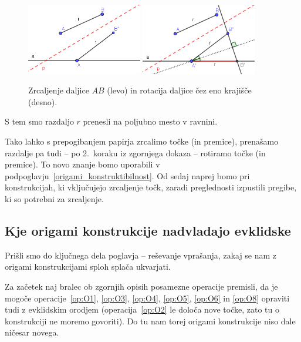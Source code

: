 \begin{dokaz}
    \begin{figure}[h]
        \centering
        \includegraphics[width=0.45\textwidth]{images/zrcaljenje_korak1.png}
        \includegraphics[width=0.45\textwidth]{images/zrcaljenje_korak2.png}
        \caption[Prenašanje razdalj z origamijem po korakih]{Zrcaljenje daljice $AB$ (levo) in rotacija daljice čez eno krajišče (desno).}
        \label{fig:prenos_razdalje_koraki}
    \end{figure}

    S tem smo razdaljo $r$ prenesli na poljubno mesto v ravnini.
\end{dokaz}

Tako lahko s prepogibanjem papirja zrcalimo točke (in premice), prenašamo razdalje pa tudi -- po 2.\ koraku iz zgornjega dokaza -- rotiramo točke (in premice). To novo znanje bomo uporabili v podpoglavju~\ref{origami_konstruktibilnost}. Od sedaj naprej bomo pri konstrukcijah, ki vključujejo zrcaljenje točk, zaradi preglednosti izpustili pregibe, ki so potrebni za zrcaljenje.

\subsection{Kje origami konstrukcije nadvladajo evklidske}

Prišli smo do ključnega dela poglavja -- reševanje vprašanja, zakaj se nam z origami konstrukcijami sploh splača ukvarjati.

Za začetek naj bralec ob zgornjih opisih posamezne operacije premisli, da je mogoče operacije~\ref{op:O1}, \ref{op:O3}, \ref{op:O4}, \ref{op:O5}, \ref{op:O6} in \ref{op:O8} opraviti tudi z evklidskim orodjem (operacija~\ref{op:O2} le določa nove točke, zato tu o konstrukciji ne moremo govoriti). Do tu nam torej origami konstrukcije niso dale ničesar novega.

